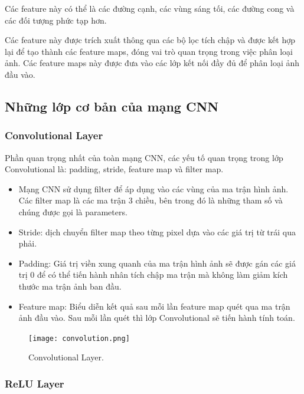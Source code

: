 Các feature này có thể là các đường cạnh, các vùng sáng tối, các đường cong và các đối tượng phức tạp hơn. 

Các feature này được trích xuất thông qua các bộ lọc tích chập và được kết hợp lại để tạo thành các feature maps, đóng vai trò quan trọng trong việc phân loại ảnh. Các feature maps này được đưa vào các lớp kết nối đầy đủ để phân loại ảnh đầu vào.

\subsection{Những lớp cơ bản của mạng CNN}

\subsubsection{Convolutional Layer}

Phần quan trọng nhất của toàn mạng CNN, các yếu tố quan trọng trong lớp Convolutional là: padding, stride, feature map và filter map.

\begin{itemize}
	\item Mạng CNN sử dụng filter để áp dụng vào các vùng của ma trận hình ảnh. Các filter map là các ma trận 3 chiều, bên trong đó là những tham số và chúng được gọi là parameters.
	
	\item Stride: dịch chuyển filter map theo từng pixel dựa vào các giá trị từ trái qua phải.
	
	\item Padding: Giá trị viền xung quanh của ma trận hình ảnh sẽ được gán các giá trị 0 để có thể tiến hành nhân tích chập ma trận mà không làm giảm kích thước ma trận ảnh ban đầu.
	
	\item Feature map: Biểu diễn kết quả sau mỗi lần feature map quét qua ma trận ảnh đầu vào. Sau mỗi lần quét thì lớp Convolutional sẽ tiến hành tính toán.
\end{itemize}

\begin{figure}[h!]
	\centering
	\texttt{[image: convolution.png]}
	\caption[Convolutional Layer.]{Convolutional Layer.}
	\label{fig:convolution} 
\end{figure}

\subsubsection{ReLU Layer}


